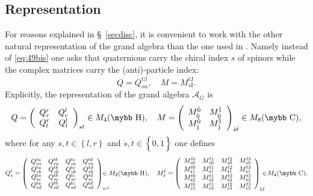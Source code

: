 \documentclass[11pt]{article}
\newcommand{\A}{\mathcal A}
\def\bb#1{\hbox{\mybb#1}}
\newcommand{\sI}{\mathrm  I}
\newcommand{\sJ}{\mathrm J}
\begin{document}
\subsection{Representation}
\label{subsec:representation}

For reasons explained in \S~\ref{secdisc}, it
is convenient to work with the other natural
representation of the grand algebra than the one used in
\cite{Devastato:2013fk}. Namely instead of
\eqref{eq:49bis} one asks that quaternions carry the
chiral index $s$ of spinors while the complex matrices carry the (anti)-particle
index:
\begin{equation}
  \label{eq:49}
  Q= Q_{ s \alpha}^{t\beta}, \quad M = M_{\dot s\sI}^{\dot t\sJ}.
\end{equation}
 Explicitly, the representation of the grand
algebra $\A_G$ is 
  \begin{equation}
    \label{eq:16}
Q = \left(
\begin{array}{cc}
 Q^{r}_{r} &  Q^{l}_{r}\\
Q^{r}_{l} & Q^{l}_{l}
\end{array}\right)_{s t}\in M_4(\bb H),\quad
  M%
= \left(
\begin{array}{cc}
M_{\dot 0}^{\dot 0} & M_{\dot 0}^{\dot 1}\\
M_{\dot 1}^{\dot 0} &M_{\dot 1}^{\dot 1}
\end{array}\right)_{\dot s \dot t} \in M_8(\bb C) , 
  \end{equation}
where for any
$s,
t\in\left\{l,r\right\}$ and $\dot s, \dot t\in\left\{\dot 0, \dot 1\right\}$ one defines
\begin{equation*}
Q_s^t =  \left(\begin{array}{cccc}
 Q_{ s a}^{t a}  & Q_{s a}^{t b}  & Q_{s a}^{t c}& Q_{s a}^{ t d}\\
  Q_{ s b}^{t a}  & Q_{ s b}^{t b}  & Q_{s b}^{t c}& Q_{s b}^{t d}\\
 Q_{s c}^{t a}  & Q_{s c}^{t b}  & Q_{s c}^{t c}& Q_{s c}^{t d}\\
 Q_{s d}^{t a}  & Q_{s d}^{t b}  & Q_{s d}^{t c}& Q_{s d}^{t d}
\end{array}\right)_{\alpha\beta}\!\!\!\!\!\!\!\!\in M_2(\bb H),\quad
  M_{\dot s}^{\dot t} = \left(\begin{array}{cccc}
 M_{\dot s 0}^{\dot t 0}  & M_{\dot s 0}^{\dot t 1}  & M_{\dot s 0}^{\dot t 2}& M_{\dot s 0}^{\dot t 3}\\
  M_{\dot s 1}^{\dot t 0}  & M_{\dot s 1}^{\dot t 1}  & M_{\dot s 1}^{\dot t 2}& M_{\dot s 1}^{\dot t 3}\\
 M_{\dot s 2}^{\dot t 0}  & M_{\dot s 2}^{\dot t 1}  & M_{\dot s 2}^{\dot t 2}& M_{\dot s 2}^{\dot t 3}\\
 M_{\dot s 3}^{\dot t 0}  & M_{\dot s 3}^{\dot t 1}  & M_{\dot s 3}^{\dot t 2}& M_{\dot s 3}^{\dot t 3}
\end{array}\right)_{\sI\sJ}\!\!\!\!\in \! M_4(\bb C).
\end{equation*}
\end{document}
